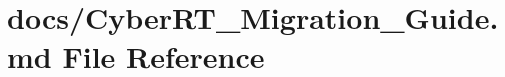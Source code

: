 \hypertarget{CyberRT__Migration__Guide_8md}{\section{docs/\-Cyber\-R\-T\-\_\-\-Migration\-\_\-\-Guide.md File Reference}
\label{CyberRT__Migration__Guide_8md}
}
